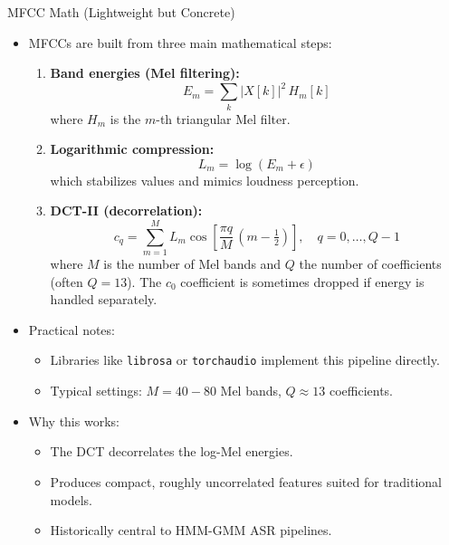 \begin{frame}[allowframebreaks]{MFCC Math (Lightweight but Concrete)}

\begin{itemize}
    \item MFCCs are built from three main mathematical steps:
    \begin{enumerate}
        \item \textbf{Band energies (Mel filtering):}
        \[
            E_m = \sum_{k} |X[k]|^2 \, H_m[k]
        \]
        where $H_m$ is the $m$-th triangular Mel filter.
        
        \item \textbf{Logarithmic compression:}
        \[
            L_m = \log(E_m + \epsilon)
        \]
        which stabilizes values and mimics loudness perception.
        
        \item \textbf{DCT-II (decorrelation):}
        \[
            c_q = \sum_{m=1}^{M} L_m \cos\!\left[\frac{\pi q}{M}\,(m - \tfrac{1}{2})\right],
            \quad q = 0, \dots, Q-1
        \]
        where $M$ is the number of Mel bands and $Q$ the number of coefficients (often $Q=13$).  
        The $c_0$ coefficient is sometimes dropped if energy is handled separately.
    \end{enumerate}

    \item Practical notes:
    \begin{itemize}
        \item Libraries like \texttt{librosa} or \texttt{torchaudio} implement this pipeline directly.
        \item Typical settings: $M = 40\!-\!80$ Mel bands, $Q \approx 13$ coefficients.
    \end{itemize}

    \item Why this works:
    \begin{itemize}
        \item The DCT decorrelates the log-Mel energies.
        \item Produces compact, roughly uncorrelated features suited for traditional models.
        \item Historically central to HMM-GMM ASR pipelines.
    \end{itemize}
\end{itemize}

\end{frame}
